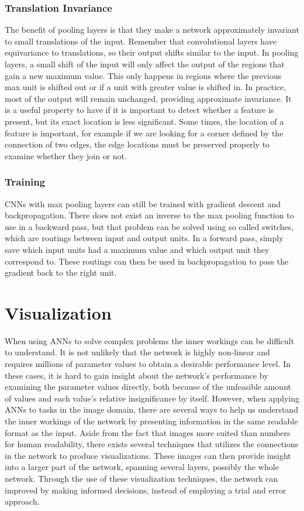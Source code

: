 \subsubsection{Translation Invariance}

The benefit of pooling layers is that they make a network approximately invariant to small translations of the input. Remember that convolutional layers have equivariance to translations, so their output shifts similar to the input. In pooling layers, a small shift of the input will only affect the output of the regions that gain a new maximum value. This only happens in regions where the previous max unit is shifted out or if a unit with greater value is shifted in. In practice, most of the output will remain unchanged, providing approximate invariance. It is a useful property to have if it is important to detect whether a feature is present, but its exact location is less significant. Some times, the location of a feature is important, for example if we are looking for a corner defined by the connection of two edges, the edge locations must be preserved properly to examine whether they join or not.

\subsubsection{Training}

CNNs with max pooling layers can still be trained with gradient descent and backpropagation. There does not exist an inverse to the max pooling function to use in a backward pass, but that problem can be solved using so called switches, which are routings between input and output units. In a forward pass, simply save which input units had a maximum value and which output unit they correspond to. These routings can then be used in backpropagation to pass the gradient back to the right unit. 


\section{Visualization}

When using ANNs to solve complex problems the inner workings can be difficult to understand. It is not unlikely that the network is highly non-linear and requires millions of parameter values to obtain a desirable performance level. In these cases, it is hard to gain insight about the network's performance by examining the parameter values directly, both because of the unfeasible amount of values and each value's relative insignificance by itself. However, when applying ANNs to tasks in the image domain, there are several ways to help us understand the inner workings of the network by presenting information in the same readable format as the input. Aside from the fact that images more suited than numbers for human readability, there exists several techniques that utilizes the connections in the network to produce visualizations. These images can then provide insight into a larger part of the network, spanning several layers, possibly the whole network. Through the use of these visualization techniques, the network can improved by making informed decisions, instead of employing a trial and error approach. 

